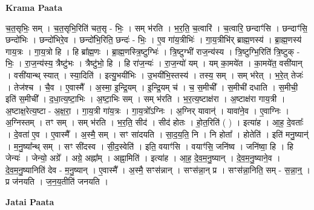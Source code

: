 \documentclass[17pt]{extarticle}
\begin{document}
\textbf{Krama Paata} \newline

च॒त॒सृभिः॒ सम् । च॒त॒सृभि॒रिति॑ चत॒सृ - भिः॒ । सम् भ॑रति । भ॒र॒ति॒ च॒त्वारि॑ । च॒त्वारि॒ छन्दाꣳ॑सि । छन्दाꣳ॑सि॒ छन्दो॑भिः । छन्दो॑भिरे॒व । छन्दो॑भि॒रिति॒ छन्दः॑ - भिः॒ । ए॒व गा॑य॒त्रीभिः॑ । गा॒य॒त्रीभि॑र् ब्राह्म॒णस्य॑ । ब्रा॒ह्म॒णस्य॑ गाय॒त्रः । गा॒य॒त्रो हि । हि ब्रा᳚ह्म॒णः । ब्रा॒ह्म॒णस्त्रि॒ष्टुग्भिः॑ । त्रि॒ष्टुग्भी॑ राज॒न्य॑स्य । त्रि॒ष्टुग्भि॒रिति॑ त्रि॒ष्टुक् - भिः॒ । रा॒ज॒न्य॑स्य॒ त्रैष्टु॑भः । त्रैष्टु॑भो॒ हि । हि रा॑ज॒न्यः॑ । रा॒ज॒न्यो॑ यम् । यम् का॒मये॑त । का॒मये॑त॒ वसी॑यान् । वसी॑यान्थ् स्यात् । स्या॒दिति॑ । इत्यु॒भयी॑भिः । उ॒भयी॑भि॒स्तस्य॑ । तस्य॒ सम् । सम् भ॑रेत् । भ॒रे॒त् तेजः॑ । तेज॑श्च । चै॒व । ए॒वास्मै᳚ । अ॒स्मा॒ इ॒न्द्रि॒यम् । इ॒न्द्रि॒यम् च॑ । च॒ स॒मीची᳚ । स॒मीची॑ दधाति । स॒मीची॒ इति॑ स॒मीची᳚ । द॒धा॒त्य॒ष्टा॒भिः । अ॒ष्टा॒भिः सम् । सम् भ॑रति । भ॒र॒त्य॒ष्टाक्ष॑रा । अ॒ष्टाक्ष॑रा गाय॒त्री । अ॒ष्टाक्ष॒रेत्य॒ष्टा - अ॒क्ष॒रा॒ । गा॒य॒त्री गा॑य॒त्रः । गा॒य॒त्रो᳚ऽग्निः । अ॒ग्निर् यावान्॑ । यावा॑ने॒व । ए॒वाग्निः । अ॒ग्निस्तम् । तꣳ सम् । सम् भ॑रति । भ॒र॒ति॒ सीद॑ । सीद॑ होतः । हो॒त॒रिति॑ ( ) । इत्या॑ह । आ॒ह॒ दे॒वताः᳚ । दे॒वता॑ ए॒व । ए॒वास्मै᳚ । अ॒स्मै॒ सम् । सꣳ सा॑दयति । सा॒द॒य॒ति॒ नि । नि होता᳚ । होतेति॑ । इति॑ मनु॒ष्यान्॑ । म॒नु॒ष्या᳚न्थ् सम् । सꣳ सी॑दस्व । सी॒द॒स्वेति॑ । इति॒ वयाꣳ॑सि । वयाꣳ॑सि॒ जनि॑ष्व । जनि॑ष्वा॒ हि । हि जेन्यः॑ । जेन्यो॒ अग्रे᳚ । अग्रे॒ अह्ना᳚म् । अह्ना॒मिति॑ । इत्या॑ह । आ॒ह॒ दे॒व॒म॒नु॒ष्यान् । दे॒व॒म॒नु॒ष्याने॒व । दे॒व॒म॒नु॒ष्यानिति॑ देव - म॒नु॒ष्यान् । ए॒वास्मै᳚ । अ॒स्मै॒ सꣳस॑न्नान् । सꣳस॑न्ना॒न् प्र । सꣳस॑न्ना॒निति॒ सम् - स॒न्ना॒न्॒ । प्र ज॑नयति । ज॒न॒य॒तीति॑ जनयति । \newline

\textbf{Jatai Paata} \newline
\end{document}
